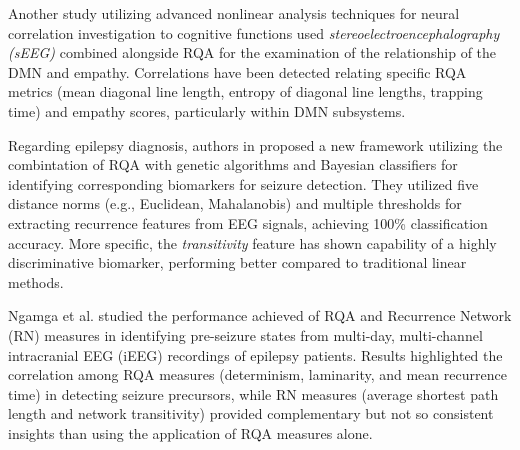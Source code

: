 \documentclass{article}
\begin{document}
Another study utilizing advanced nonlinear analysis techniques for neural correlation investigation to
cognitive functions \cite{mo} used \textit{stereoelectroencephalography (sEEG)} combined alongside RQA 
for the examination of the relationship of the DMN and empathy. 
Correlations have been detected relating specific RQA metrics 
(mean diagonal line length, entropy of diagonal line lengths, trapping time) 
and empathy scores, particularly within DMN subsystems. 


Regarding epilepsy diagnosis, authors in \cite{palanisamy2024} proposed a new framework 
utilizing the combintation of RQA with genetic algorithms and Bayesian classifiers for 
identifying corresponding biomarkers for seizure detection. 
They utilized five distance norms (e.g., Euclidean, Mahalanobis) and multiple thresholds 
for extracting recurrence features from EEG signals, achieving 100\% classification accuracy. 
More specific, the \textit{transitivity} feature has shown capability of a highly discriminative biomarker, 
performing better compared to traditional linear methods. 


Ngamga et al.\cite{ngamga2016} studied the performance achieved of RQA and Recurrence Network (RN) measures in identifying 
pre-seizure states from multi-day, multi-channel intracranial EEG (iEEG) 
recordings of epilepsy patients. 
Results highlighted the correlation among RQA measures (determinism, laminarity, and mean recurrence time) in 
detecting seizure precursors, while RN measures (average shortest path length and network transitivity) provided 
complementary but not so consistent insights than using the application of RQA measures alone.
\end{document}
